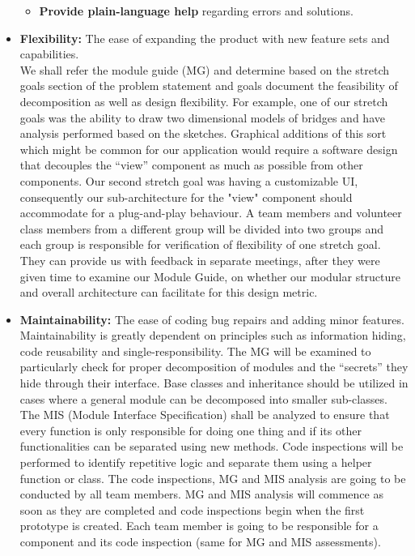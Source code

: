 \documentclass[12pt, titlepage]{article}
\begin{document}
\begin{itemize}
\begin{itemize}
    \item\textbf{Provide plain-language help} regarding errors and solutions.\\
    \end{itemize}
\item\textbf{Flexibility:} The ease of expanding the product with new feature sets and capabilities.\\
We shall refer the module guide (MG) and determine based on the stretch goals section of the problem statement and goals document the feasibility of decomposition as well as 
design flexibility. For example, one of our stretch goals was the ability to draw two dimensional models of bridges and have analysis performed based on the sketches.
Graphical additions of this sort which might be common for our application would require a software design that decouples the “view” component as much as possible from other 
components. Our second stretch goal was having a customizable UI, consequently our sub-architecture for the "view" component should accommodate for a plug-and-play behaviour. 
A team members and volunteer class members from a different group will be divided into two groups and each group is responsible for verification of flexibility of one stretch 
goal. They can provide us with feedback in separate meetings, after they were given time to examine our Module Guide, on whether our modular structure and overall architecture
can facilitate for this design metric.\\
\item\textbf{Maintainability:} The ease of coding bug repairs and adding minor features.\\
Maintainability is greatly dependent on principles such as information hiding, code reusability and single-responsibility. The MG will be examined to particularly check for proper decomposition of modules and the “secrets” they hide through their interface. Base classes and inheritance should be utilized in cases where a general module can be decomposed into smaller sub-classes. The MIS (Module Interface Specification) shall be analyzed to ensure that every function is only responsible for doing one thing and if its other functionalities can be separated using new methods. Code inspections will be performed to identify repetitive logic and separate them using a helper function or class. The code inspections, MG and MIS analysis are going to be conducted by all team members. MG and MIS analysis will commence as soon as they are completed and code inspections begin when the first prototype is created. Each team member is going to be responsible for a component and its code inspection (same for MG and MIS assessments).
\end{itemize}
\end{document}
